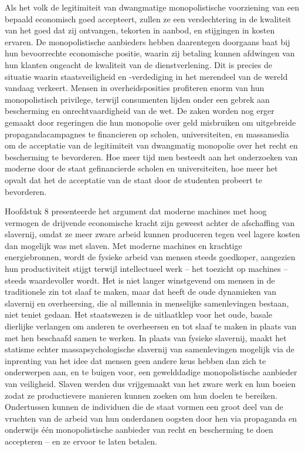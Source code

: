 \documentclass[
  a5paper,
  smalldemyvopaper,11pt,twoside,onecolumn,openright,extrafontsizes,
hidelinks]{memoir}
\begin{document}
Als het volk de legitimiteit van dwangmatige monopolistische voorziening
van een bepaald economisch goed accepteert, zullen ze een verslechtering
in de kwaliteit van het goed dat zij ontvangen, tekorten in aanbod, en
stijgingen in kosten ervaren. De monopolistische aanbieders hebben
daarentegen doorgaans baat bij hun bevoorrechte economische positie,
waarin zij betaling kunnen afdwingen van hun klanten ongeacht de
kwaliteit van de dienstverlening. Dit is precies de situatie waarin
staatsveiligheid en -verdediging in het merendeel van de wereld vandaag
verkeert. Mensen in overheidsposities profiteren enorm van hun
monopolistisch privilege, terwijl consumenten lijden onder een gebrek
aan bescherming en onrechtvaardigheid van de wet. De zaken worden nog
erger gemaakt door regeringen die hun monopolie over geld misbruiken om
uitgebreide propagandacampagnes te financieren op scholen,
universiteiten, en massamedia om de acceptatie van de legitimiteit van
dwangmatig monopolie over het recht en bescherming te bevorderen. Hoe
meer tijd men besteedt aan het onderzoeken van moderne door de staat
gefinancierde scholen en universiteiten, hoe meer het opvalt dat het de
acceptatie van de staat door de studenten probeert te bevorderen.

Hoofdstuk 8 presenteerde het argument dat moderne machines met hoog
vermogen de drijvende economische kracht zijn geweest achter de
afschaffing van slavernij, omdat ze meer zware arbeid kunnen produceren
tegen veel lagere kosten dan mogelijk was met slaven. Met moderne
machines en krachtige energiebronnen, wordt de fysieke arbeid van mensen
steeds goedkoper, aangezien hun productiviteit stijgt terwijl
intellectueel werk -- het toezicht op machines -- steeds waardevoller
wordt. Het is niet langer winstgevend om mensen in de traditionele zin
tot slaaf te maken, maar dat heeft de oude dynamieken van slavernij en
overheersing, die al millennia in menselijke samenlevingen bestaan, niet
teniet gedaan. Het staatswezen is de uitlaatklep voor het oude, basale
dierlijke verlangen om anderen te overheersen en tot slaaf te maken in
plaats van met hen beschaafd samen te werken. In plaats van fysieke
slavernij, maakt het statisme echter massapsychologische slavernij van
samenlevingen mogelijk via de inprenting van het idee dat mensen geen
andere keus hebben dan zich te onderwerpen aan, en te buigen voor, een
gewelddadige monopolistische aanbieder van veiligheid. Slaven werden dus
vrijgemaakt van het zware werk en hun boeien zodat ze productievere
manieren kunnen zoeken om hun doelen te bereiken. Ondertussen kunnen de
individuen die de staat vormen een groot deel van de vruchten van de
arbeid van hun onderdanen oogsten door hen via propaganda en onderwijs
één monopolistische aanbieder van recht en bescherming te doen
accepteren -- en ze ervoor te laten betalen.
\end{document}
